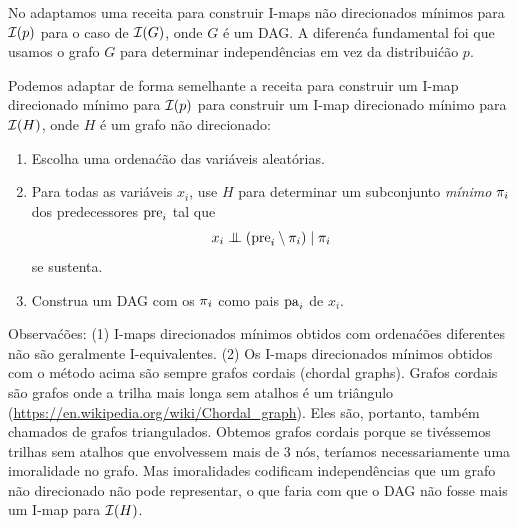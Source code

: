 No  adaptamos uma receita para construir I-maps n\~ao direcionados m\'inimos para $\mathcal{I}(p)$ para o caso de $\mathcal{I}(G)$, onde $G$ \'e um DAG. A diferen\'ca fundamental foi que usamos o grafo $G$ para determinar independ\^encias em vez da distribui\'c\~ao $p$.

Podemos adaptar de forma semelhante a receita para construir um I-map direcionado m\'inimo para $\mathcal{I}(p)$ para construir um I-map direcionado m\'inimo para $\mathcal{I}(H)$, onde $H$ \'e um grafo n\~ao direcionado:
\begin{enumerate}
\item Escolha uma ordena\'c\~ao das vari\'aveis aleat\'orias.
\item Para todas as vari\'aveis $x_i$, use $H$ para determinar um subconjunto \emph{m\'inimo} $\pi_i$ dos predecessores $\mathrm{pre}_i$ tal que
$$ x_i \mathrel{\perp\mspace{-10mu}\perp} \left(\mathrm{pre}_i \setminus \pi_i\right) \mid \pi_i $$
se sustenta.
\item Construa um DAG com os $\pi_i$ como pais $\mathrm{pa}_i$ de $x_i$.
\end{enumerate}
Observa\'c\~oes: (1) I-maps direcionados m\'inimos obtidos com ordena\'c\~oes diferentes n\~ao s\~ao geralmente I-equivalentes. (2) Os I-maps direcionados m\'inimos obtidos com o m\'etodo acima s\~ao sempre grafos cordais (chordal graphs). Grafos cordais s\~ao grafos onde a trilha mais longa sem atalhos \'e um tri\^angulo (\url{https://en.wikipedia.org/wiki/Chordal_graph}). Eles s\~ao, portanto, tamb\'em chamados de grafos triangulados. Obtemos grafos cordais porque se tiv\'essemos trilhas sem atalhos que envolvessem mais de 3 n\'os, ter\'iamos necessariamente uma imoralidade no grafo. Mas imoralidades codificam independ\^encias que um grafo n\~ao direcionado n\~ao pode representar, o que faria com que o DAG n\~ao fosse mais um I-map para $\mathcal{I}(H)$.

